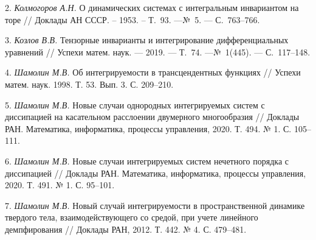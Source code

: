 \documentclass{vzmsthesis}
\begin{document}
2. {\it Колмогоров А.Н.} О динамических системах с интегральным инвариантом на торе 
// Доклады АН СССР. -- 1953. -- Т.~93. ---№~5. --- С.~763--766.

3. {\it Козлов В.В.} Тензорные инварианты и интегрирование дифференциальных
уравнений // Успехи матем. наук. --- 2019. --- Т.~74. ---№~1(445). --- С.~117--148.

4. {\it Шамолин М.В.} Об интегрируемости в трансцендентных функциях // Успехи матем. наук. 1998. Т. 53. Вып. 3. С. 209–210. 

5. {\it Шамолин М.В.} Новые случаи однородных интегрируемых систем с диссипацией на касательном расслоении двумерного многообразия // Доклады РАН. Математика, информатика, процессы управления, 2020. Т. 494. № 1. С. 105–111. 

6. {\it Шамолин М.В.} Новые случаи интегрируемых систем нечетного порядка с диссипацией // Доклады РАН. Математика, информатика, процессы управления, 2020. Т. 491. № 1. С. 95–101. 

7. {\it Шамолин М.В.} Новый случай интегрируемости в пространственной динамике твердого тела, взаимодействующего со средой, при учете линейного демпфирования // Доклады РАН, 2012. Т. 442. № 4. С. 479–481. 


\end{document}
